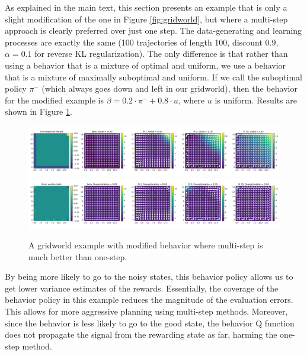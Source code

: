 \label{sec:app_grid}

As explained in the main text, this section presents an example that is only a slight modification of the one in Figure \ref{fig:gridworld}, but where a multi-step approach is clearly preferred over just one step. The data-generating and learning processes are exactly the same (100 trajectories of length 100, discount 0.9, $ \alpha = 0.1$ for reverse KL regularization). The only difference is that rather than using a behavior that is a mixture of optimal and uniform, we use a behavior that is a mixture of maximally suboptimal and uniform. If we call the suboptimal policy $ \pi^-$ (which always goes down and left in our gridworld), then the behavior for the modified example is $ \beta = 0.2 \cdot \pi^- + 0.8 \cdot u$, where $ u $ is uniform. Results are shown in Figure \ref{fig:multi_gridworld}.

\begin{figure}[h]
    \centering
    \includegraphics[width=\textwidth]{figures/offline-rl/gridworld/multi_gridworld_flat.png}
    \includegraphics[width=\textwidth]{figures/offline-rl/gridworld/multi_gridworld_error.png}
    \caption{A gridworld example with modified behavior where multi-step is much better than one-step.}
    \label{fig:multi_gridworld}
\end{figure}

By being more likely to go to the noisy states, this behavior policy allows us to get lower variance estimates of the rewards. Essentially, the coverage of the behavior policy in this example reduces the magnitude of the evaluation errors. This allows for more aggressive planning using multi-step methods. Moreover, since the behavior is less likely to go to the good state, the behavior Q function does not propagate the signal from the rewarding state as far, harming the one-step method.


